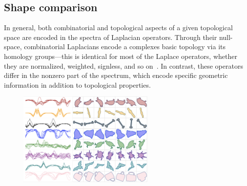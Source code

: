 \documentclass[10pt]{article}
\numberwithin{equation}{section}
\newcommand{\+}{%
	\raisebox{0.18ex}{\scaleobj{0.55}{+}}
}
\theoremstyle{definition}
\theoremstyle{definition}
\begin{document}



%

\subsection{Shape comparison}
In general, both combinatorial and topological aspects of a given topological space are encoded in the spectra of Laplacian operators. 
Through their null-space, combinatorial Laplacians encode a complexes basic topology via its homology groups---this is identical for most of the Laplace operators, whether they are normalized, weighted, signless, and so on~\cite{}.
In contrast, these operators differ in the nonzero part of the spectrum, which encode specific geometric information in addition to topological properties. 

 
\begin{figure}
	\centering
	\includegraphics[width=0.6\textwidth]{shape_signatures}
\end{figure}
\end{document}
